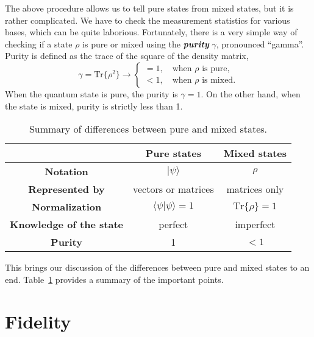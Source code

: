 The above procedure allows us to tell pure states from mixed states, but it is rather complicated.
We have to check the measurement statistics for various bases, which can be quite laborious.
Fortunately, there is a very simple way of checking if a state $\rho$ is pure or mixed using the \textbf{\emph{purity}} $\gamma$, pronounced ``gamma''.
Purity is defined as the trace of the square of the density matrix,
\begin{equation}
    \gamma = \text{Tr} \{ \rho^2 \} \longrightarrow \begin{cases}
        = 1, \quad \text{when } \rho \text{ is pure}, \\
        < 1, \quad \text{when } \rho \text{ is mixed}.
    \end{cases}
\end{equation}
When the quantum state is pure, the purity is $\gamma=1$.
On the other hand, when the state is mixed, purity is strictly less than 1.

\begin{table}[t]
    \setcellgapes{5pt}
    \renewcommand\theadfont{}
    \makegapedcells
    \centering
    \begin{tabular}{ccc}
        \hline
        & \textbf{Pure states} & \textbf{Mixed states} \\
        \hline
        \textbf{Notation} & $|\psi\rangle$ & $\rho$ \\
        \textbf{Represented by} & vectors or matrices & matrices only \\
        \textbf{Normalization} & $\langle\psi|\psi\rangle=1$ & $\text{Tr}\{\rho\}=1$ \\
        \textbf{Knowledge of the state} & perfect & imperfect \\
        \textbf{Purity} & 1 & $<1$ \\
        \hline
    \end{tabular}
    \caption[Pure versus mixed states.]{Summary of differences between pure and mixed states.}
    \label{tab:3-4_pure_vs_mixed}
\end{table}

This brings our discussion of the differences between pure and mixed states to an end.
Table~\ref{tab:3-4_pure_vs_mixed} provides a summary of the important points.




\section{Fidelity}
\label{sec:3-5_fidelity}

